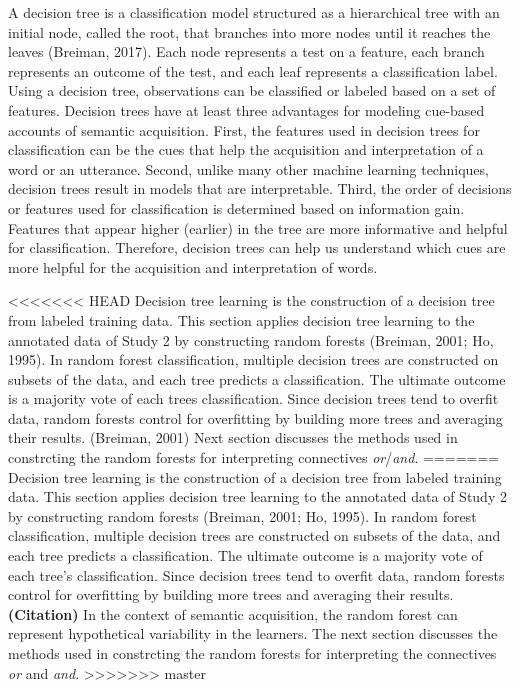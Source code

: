 \documentclass[,man,floatsintext]{apa6}
\begin{document}
A decision tree is a classification model structured as a hierarchical tree with an initial node, called the root, that branches into more nodes until it reaches the leaves (Breiman, 2017). Each node represents a test on a feature, each branch represents an outcome of the test, and each leaf represents a classification label. Using a decision tree, observations can be classified or labeled based on a set of features. Decision trees have at least three advantages for modeling cue-based accounts of semantic acquisition. First, the features used in decision trees for classification can be the cues that help the acquisition and interpretation of a word or an utterance. Second, unlike many other machine learning techniques, decision trees result in models that are interpretable. Third, the order of decisions or features used for classification is determined based on information gain. Features that appear higher (earlier) in the tree are more informative and helpful for classification. Therefore, decision trees can help us understand which cues are more helpful for the acquisition and interpretation of words.

<<<<<<< HEAD
Decision tree learning is the construction of a decision tree from labeled training data. This section applies decision tree learning to the annotated data of Study 2 by constructing random forests (Breiman, 2001; Ho, 1995). In random forest classification, multiple decision trees are constructed on subsets of the data, and each tree predicts a classification. The ultimate outcome is a majority vote of each trees classification. Since decision trees tend to overfit data, random forests control for overfitting by building more trees and averaging their results. (Breiman, 2001) Next section discusses the methods used in constrcting the random forests for interpreting connectives \emph{or}/\emph{and}.
=======
Decision tree learning is the construction of a decision tree from labeled training data. This section applies decision tree learning to the annotated data of Study 2 by constructing random forests (Breiman, 2001; Ho, 1995). In random forest classification, multiple decision trees are constructed on subsets of the data, and each tree predicts a classification. The ultimate outcome is a majority vote of each tree's classification. Since decision trees tend to overfit data, random forests control for overfitting by building more trees and averaging their results. \textbf{(Citation)} In the context of semantic acquisition, the random forest can represent hypothetical variability in the learners. The next section discusses the methods used in constrcting the random forests for interpreting the connectives \emph{or} and \emph{and}.
>>>>>>> master
\end{document}
